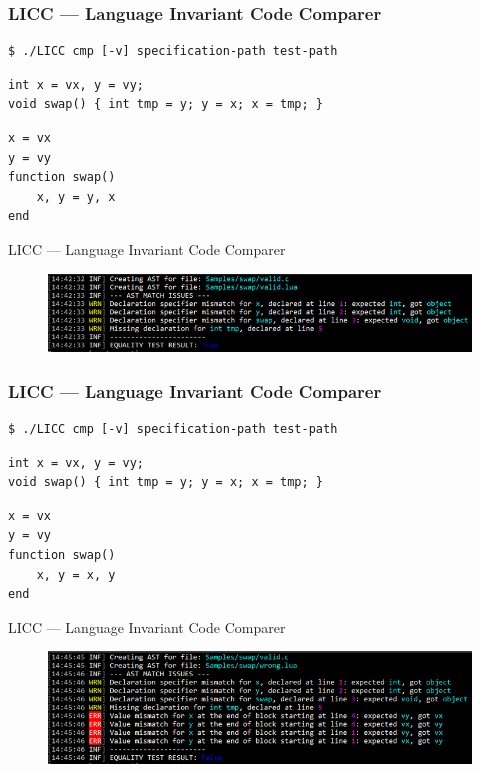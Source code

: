 \documentclass{beamer}
\begin{document}
\begin{frame}[fragile]
    \frametitle{LICC --- Language Invariant Code Comparer}
\begin{lstlisting}[numbers=none,language={}]
$ ./LICC cmp [-v] specification-path test-path
\end{lstlisting}
\begin{lstlisting}
int x = vx, y = vy;
void swap() { int tmp = y; y = x; x = tmp; }
\end{lstlisting}
\begin{lstlisting}
x = vx
y = vy
function swap()
    x, y = y, x
end
\end{lstlisting}
\end{frame}

\begin{frame}{LICC --- Language Invariant Code Comparer}
    \begin{figure}[h!]
        \centering
        \includegraphics[scale=0.6]{images/eval/swap_valid_valid.PNG}
    \end{figure}
\end{frame}

\begin{frame}[fragile]
    \frametitle{LICC --- Language Invariant Code Comparer}
\begin{lstlisting}[numbers=none,language={}]
$ ./LICC cmp [-v] specification-path test-path
\end{lstlisting}
\begin{lstlisting}
int x = vx, y = vy;
void swap() { int tmp = y; y = x; x = tmp; }
\end{lstlisting}
\begin{lstlisting}
x = vx
y = vy
function swap()
    x, y = x, y
end
\end{lstlisting}
\end{frame}

\begin{frame}{LICC --- Language Invariant Code Comparer}
    \begin{figure}[h!]
        \centering
        \includegraphics[scale=0.6]{images/eval/swap_valid_wrong.PNG}
    \end{figure}
\end{frame}
\end{document}
